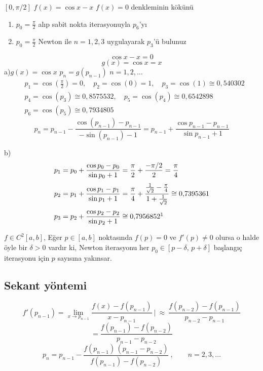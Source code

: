 \documentclass[11pt,a4paper]{article}
\begin{document}
\begin{ornek}
$[0,\pi/2]$ \quad $f(x)=\cos x-x$ \qquad $f(x)=0$ denkleminin kökünü
\begin{enumerate}[label=\alph*)]
  \item $p_0=\frac{\pi}{2}$ alıp sabit nokta iterasyonuyla $p_6$'yı
  \item $p_0=\frac{\pi}{2}$ Newton ile $n=1,2,3$ uygulayarak $p_3$'ü bulunuz
\end{enumerate}
\end{ornek}
\[ \cos x-x=0 \]
\[ g(x)=\cos x=x \]
a)\quad $g(x)=\cos x$ \qquad $p_n=g(p_{n-1})$ \quad $n=1,2,\dots$
\begin{align*}
  &p_1=\cos\left(\tfrac{\pi}{2}\right)=0,\quad p_2=\cos(0)=1,\quad p_3=\cos(1)\cong0{,}540302\\
  &p_4=\cos(p_3)\cong0{,}8575532,\quad p_5=\cos(p_4)\cong0{,}6542898\\
  &p_6=\cos(p_5)\cong0{,}7934805
\end{align*}
\[
  p_n=p_{n-1}-\frac{\cos(p_{n-1})-p_{n-1}}{-\sin(p_{n-1})-1}
     =p_{n-1}+\frac{\cos p_{n-1}-p_{n-1}}{\sin p_{n-1}+1}
\]

b)
\begin{align*}
  p_1&=p_0+\frac{\cos p_0-p_0}{\sin p_0+1}=\frac{\pi}{2}+\frac{-\pi/2}{2}=\frac{\pi}{4}\\[1mm]
  p_2&=p_1+\frac{\cos p_1-p_1}{\sin p_1+1}=\frac{\pi}{4}+\frac{\frac{1}{\sqrt2}-\frac{\pi}{4}}{1+\frac{1}{\sqrt2}}\cong0{,}7395361\\[1mm]
  p_3&=p_2+\frac{\cos p_2-p_2}{\sin p_2+1}\cong0{,}7956852\footnotemark
\end{align*}

\begin{teorem}[1]
$f\in C^2[a,b]$, Eğer $p\in[a,b]$ noktasında $f(p)=0$ ve $f'(p)\neq0$ olursa o halde öyle bir
$\delta>0$ vardır ki, Newton iterasyonu her $p_0\in[p-\delta,\,p+\delta]$ başlangıç iterasyonu için
$p$ sayısına yakınsar.

\hfill
{}
\end{teorem}

\subsection{Sekant yöntemi}
\[
  f'(p_{n-1})=\lim_{x\to p_{n-1}}\frac{f(x)-f(p_{n-1})}{x-p_{n-1}}\ \Bigg|\
  \approx\ \frac{f(p_{n-2})-f(p_{n-1})}{p_{n-2}-p_{n-1}}
\]
\[
  =\frac{f(p_{n-1})-f(p_{n-2})}{p_{n-1}-p_{n-2}}
\]
\[
  p_n=p_{n-1}-\frac{f(p_{n-1})\,(p_{n-1}-p_{n-2})}{f(p_{n-1})-f(p_{n-2})}\ , \qquad n=2,3,\dots
\]
\end{document}
